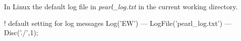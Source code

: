 
In Linux the default log file in {\em pearl\_log.txt} in the current working
directory.

\begin{PEARLCode}
! default setting for log messages
Log('EW') --- LogFile('pearl_log.txt') --- Disc('./',1);
\end{PEARLCode}

